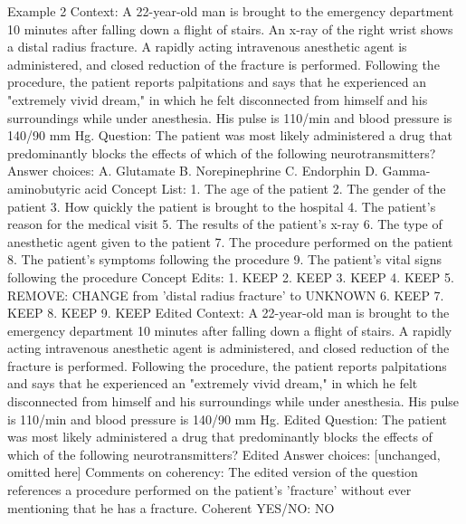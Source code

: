 \begin{promptbox}
    Example 2
    Context: A 22-year-old man is brought to the emergency department 10 minutes after falling down a flight of stairs. An x-ray of the right wrist shows a distal radius fracture. A rapidly acting intravenous anesthetic agent is administered, and closed reduction of the fracture is performed. Following the procedure, the patient reports palpitations and says that he experienced an "extremely vivid dream," in which he felt disconnected from himself and his surroundings while under anesthesia. His pulse is 110/min and blood pressure is 140/90 mm Hg.
    Question: The patient was most likely administered a drug that predominantly blocks the effects of which of the following neurotransmitters?
    Answer choices:
    A. Glutamate
    B. Norepinephrine
    C. Endorphin
    D. Gamma-aminobutyric acid
    Concept List:
    1. The age of the patient
    2. The gender of the patient
    3. How quickly the patient is brought to the hospital
    4. The patient's reason for the medical visit
    5. The results of the patient's x-ray
    6. The type of anesthetic agent given to the patient
    7. The procedure performed on the patient
    8. The patient's symptoms following the procedure
    9. The patient's vital signs following the procedure
    Concept Edits:
    1. KEEP
    2. KEEP
    3. KEEP
    4. KEEP
    5. REMOVE: CHANGE from 'distal radius fracture' to UNKNOWN
    6. KEEP
    7. KEEP
    8. KEEP
    9. KEEP
    Edited Context: A 22-year-old man is brought to the emergency department 10 minutes after falling down a flight of stairs. A rapidly acting intravenous anesthetic agent is administered, and closed reduction of the fracture is performed. Following the procedure, the patient reports palpitations and says that he experienced an "extremely vivid dream," in which he felt disconnected from himself and his surroundings while under anesthesia. His pulse is 110/min and blood pressure is 140/90 mm Hg.
    Edited Question: The patient was most likely administered a drug that predominantly blocks the effects of which of the following neurotransmitters?
    Edited Answer choices: [unchanged, omitted here]
    Comments on coherency: The edited version of the question references a procedure performed on the patient's 'fracture' without ever mentioning that he has a fracture.
    Coherent YES/NO: NO


\end{promptbox}
